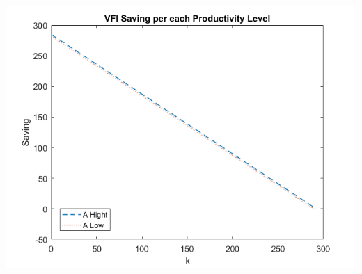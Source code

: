 \documentclass[12pt]{article}%
\begin{document}
\begin{enumerate}
	\begin{center}
		\includegraphics[width=0.7\linewidth]{savingP5}
	\end{center}
	
	
	
\end{enumerate}

\strut

\onehalfspacing
\end{document}
